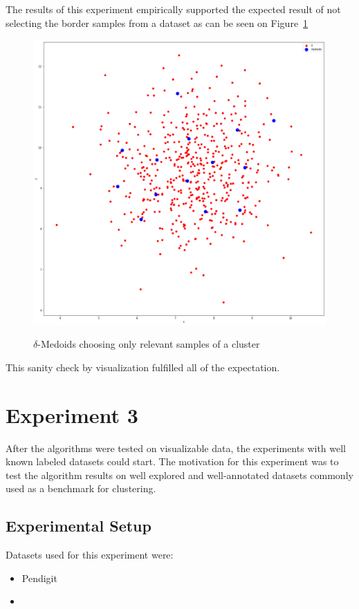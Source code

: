 \documentclass[thesis=B,english]{FITthesis}[2012/10/20]
\begin{document}
The results of this experiment empirically supported the expected result of not selecting the border samples from a dataset as can be seen on Figure~\ref{img:blobs_good_select}
\begin{figure}
  \includegraphics[width=\linewidth]{img/delta_medoids_select_better.png}
  \label{img:blobs_good_select}
  \caption{$\delta$-Medoids choosing only relevant samples of a cluster}
\end{figure}
This sanity check by visualization fulfilled all of the expectation.

\section{Experiment 3}\label{sec:exp3}

After the algorithms were tested on visualizable data, the experiments with well known labeled datasets could start.
The motivation for this experiment was to test the algorithm results on well explored and well-annotated datasets commonly used as a benchmark for clustering.

\subsection{Experimental Setup}
Datasets used for this experiment were:
\begin{itemize}
    \item Pendigit
    \item
\end{itemize}
\end{document}
